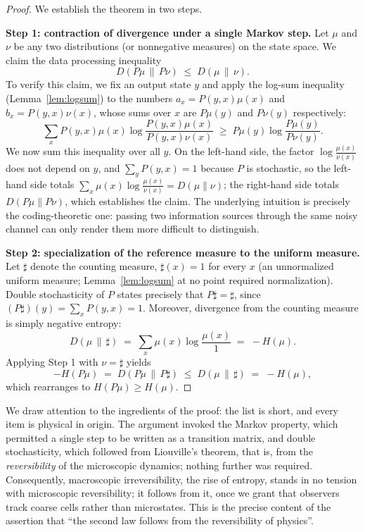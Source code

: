 \documentclass[11pt]{article}
\begin{document}
\begin{proof}
We establish the theorem in two steps.

\textbf{Step 1: contraction of divergence under a single Markov step.} Let $\mu$ and $\nu$ be any two distributions (or nonnegative measures) on the state space. We claim the data processing inequality
\[
D(P\mu \,\|\, P\nu) \;\le\; D(\mu \,\|\, \nu).
\]
To verify this claim, we fix an output state $y$ and apply the log-sum inequality (Lemma~\ref{lem:logsum}) to the numbers $a_x = P(y,x)\mu(x)$ and $b_x = P(y,x)\nu(x)$, whose sums over $x$ are $P\mu(y)$ and $P\nu(y)$ respectively:
\[
\sum_x P(y,x)\mu(x) \log \frac{P(y,x)\mu(x)}{P(y,x)\nu(x)} \;\ge\; P\mu(y) \log \frac{P\mu(y)}{P\nu(y)}.
\]
We now sum this inequality over all $y$. On the left-hand side, the factor $\log\frac{\mu(x)}{\nu(x)}$ does not depend on $y$, and $\sum_y P(y,x) = 1$ because $P$ is stochastic, so the left-hand side totals $\sum_x \mu(x)\log\frac{\mu(x)}{\nu(x)} = D(\mu\|\nu)$; the right-hand side totals $D(P\mu \| P\nu)$, which establishes the claim. The underlying intuition is precisely the coding-theoretic one: passing two information sources through the same noisy channel can only render them more difficult to distinguish.

\textbf{Step 2: specialization of the reference measure to the uniform measure.} Let $\sharp$ denote the counting measure, $\sharp(x) = 1$ for every $x$ (an unnormalized uniform measure; Lemma~\ref{lem:logsum} at no point required normalization). Double stochasticity of $P$ states precisely that $P\sharp = \sharp$, since $(P\sharp)(y) = \sum_x P(y,x) = 1$. Moreover, divergence from the counting measure is simply negative entropy:
\[
D(\mu \,\|\, \sharp) \;=\; \sum_x \mu(x) \log \frac{\mu(x)}{1} \;=\; -H(\mu).
\]
Applying Step 1 with $\nu = \sharp$ yields
\[
-H(P\mu) \;=\; D(P\mu \,\|\, P \sharp) \;\le\; D(\mu \,\|\, \sharp) \;=\; -H(\mu),
\]
which rearranges to $H(P\mu) \ge H(\mu)$.
\end{proof}

We draw attention to the ingredients of the proof: the list is short, and every item is physical in origin. The argument invoked the Markov property, which permitted a single step to be written as a transition matrix, and double stochasticity, which followed from Liouville's theorem, that is, from the \emph{reversibility} of the microscopic dynamics; nothing further was required. Consequently, macroscopic irreversibility, the rise of entropy, stands in no tension with microscopic reversibility; it follows from it, once we grant that observers track coarse cells rather than microstates. This is the precise content of the assertion that ``the second law follows from the reversibility of physics''.
\end{document}
